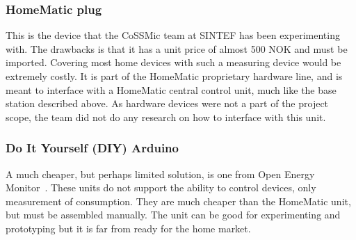\subsubsection{HomeMatic plug}
This is the device that the CoSSMic team at SINTEF has been experimenting with. The drawbacks is that it has a unit price of almost 500 NOK and must be imported. Covering most home devices with such a measuring device would be extremely costly. It is part of the HomeMatic proprietary hardware line, and is meant to interface with a HomeMatic central control unit, much like the base station described above. As hardware devices were not a part of the project scope, the team did not do any research on how to interface with this unit. %

\subsubsection{Do It Yourself (DIY) Arduino}
A much cheaper, but perhaps limited solution, is one from Open Energy Monitor~\cite{oemmodule}. These units do not support the ability to control devices, only measurement of consumption. They are much cheaper than the HomeMatic unit, but must be assembled manually. The unit can be good for experimenting and prototyping but it is far from ready for the home market.


